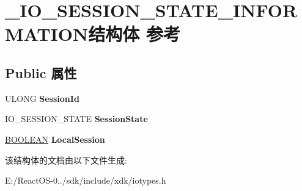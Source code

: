 \hypertarget{struct___i_o___s_e_s_s_i_o_n___s_t_a_t_e___i_n_f_o_r_m_a_t_i_o_n}{}\section{\+\_\+\+I\+O\+\_\+\+S\+E\+S\+S\+I\+O\+N\+\_\+\+S\+T\+A\+T\+E\+\_\+\+I\+N\+F\+O\+R\+M\+A\+T\+I\+O\+N结构体 参考}
\label{struct___i_o___s_e_s_s_i_o_n___s_t_a_t_e___i_n_f_o_r_m_a_t_i_o_n}
\subsection*{Public 属性}
\begin{DoxyCompactItemize}
\item 
\mbox{\label{struct___i_o___s_e_s_s_i_o_n___s_t_a_t_e___i_n_f_o_r_m_a_t_i_o_n_a0d40de49d77eece0fbf4b1099e81af33}} 
U\+L\+O\+NG {\bfseries Session\+Id}
\item 
\mbox{\label{struct___i_o___s_e_s_s_i_o_n___s_t_a_t_e___i_n_f_o_r_m_a_t_i_o_n_a752eac27000d82564c4db6d0f5476798}} 
I\+O\+\_\+\+S\+E\+S\+S\+I\+O\+N\+\_\+\+S\+T\+A\+TE {\bfseries Session\+State}
\item 
\mbox{\label{struct___i_o___s_e_s_s_i_o_n___s_t_a_t_e___i_n_f_o_r_m_a_t_i_o_n_ad50dd1da2d9eda55f7552273f6d9c0f0}} 
\hyperlink{_processor_bind_8h_a112e3146cb38b6ee95e64d85842e380a}{B\+O\+O\+L\+E\+AN} {\bfseries Local\+Session}
\end{DoxyCompactItemize}


该结构体的文档由以下文件生成\+:\begin{DoxyCompactItemize}
\item 
E\+:/\+React\+O\+S-\/0../sdk/include/xdk/iotypes.\+h\end{DoxyCompactItemize}
